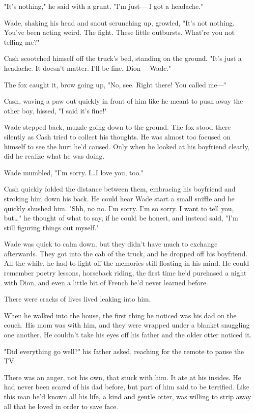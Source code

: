 "It's nothing," he said with a grunt. "I'm just--- I got a headache."

Wade, shaking his head and snout scrunching up, growled, "It's not nothing. You've been acting weird. The fight. These little outbursts. What're you not telling me?"

Cash scootched himself off the truck's bed, standing on the ground. "It's just a headache. It doesn't matter. I'll be fine, Dion--- Wade."

The fox caught it, brow going up, "No, see. Right there! You called me---"

Cash, waving a paw out quickly in front of him like he meant to push away the other boy, hissed, "I said it's fine!"

Wade stepped back, muzzle going down to the ground. The fox stood there silently as Cash tried to collect his thoughts. He was almost too focused on himself to see the hurt he'd caused. Only when he looked at his boyfriend clearly, did he realize what he was doing.

Wade mumbled, "I'm sorry. I\ldots I love you, too."

Cash quickly folded the distance between them, embracing his boyfriend and stroking him down his back. He could hear Wade start a small sniffle and he quickly shushed him. "Shh, no no. I'm sorry. I'm so sorry. I want to tell you, but\ldots" he thought of what to say, if he could be honest, and instead said, "I'm still figuring things out myself."

Wade was quick to calm down, but they didn't have much to exchange afterwards. They got into the cab of the truck, and he dropped off his boyfriend. All the while, he had to fight off the memories still floating in his mind. He could remember poetry lessons, horseback riding, the first time he'd purchased a night with Dion, and even a little bit of French he'd never learned before.

There were cracks of lives lived leaking into him.

When he walked into the house, the first thing he noticed was his dad on the couch. His mom was with him, and they were wrapped under a blanket snuggling one another. He couldn't take his eyes off his father and the older otter noticed it.

"Did everything go well?" his father asked, reaching for the remote to pause the TV.

There was an anger, not his own, that stuck with him. It ate at his insides. He had never been scared of his dad before, but part of him said to be terrified. Like this man he'd known all his life, a kind and gentle otter, was willing to strip away all that he loved in order to save face.

